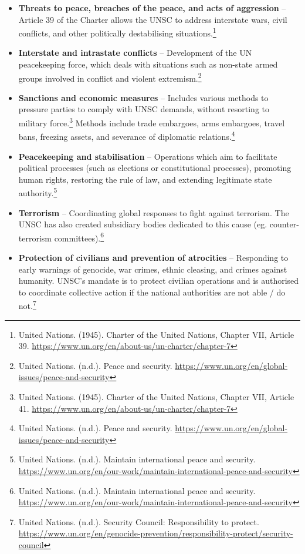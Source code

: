 \begin{itemize}
  \item \textbf{Threats to peace, breaches of the peace, and acts of aggression} -- Article 39 of the Charter allows the UNSC to address interstate wars, civil conflicts, and other politically destabilising situations.\footnote{United Nations. (1945). Charter of the United Nations, Chapter VII, Article 39. \url{https://www.un.org/en/about-us/un-charter/chapter-7}}
  \item \textbf{Interstate and intrastate conflicts} -- Development of the UN peacekeeping force, which deals with situations such as non-state armed groups involved in conflict and violent extremism.\footnote{United Nations. (n.d.). Peace and security. \url{https://www.un.org/en/global-issues/peace-and-security}}
  \item \textbf{Sanctions and economic measures} -- Includes various methods to pressure parties to comply with UNSC demands, without resorting to military force.\footnote{United Nations. (1945). Charter of the United Nations, Chapter VII, Article 41. \url{https://www.un.org/en/about-us/un-charter/chapter-7}} Methods include trade embargoes, arms embargoes, travel bans, freezing assets, and severance of diplomatic relations.\footnote{United Nations. (n.d.). Peace and security. \url{https://www.un.org/en/global-issues/peace-and-security}}
  \item \textbf{Peacekeeping and stabilisation} -- Operations which aim to facilitate political processes (such as elections or constitutional processes), promoting human rights, restoring the rule of law, and extending legitimate state authority.\footnote{United Nations. (n.d.). Maintain international peace and security. \url{https://www.un.org/en/our-work/maintain-international-peace-and-security}}
  \item \textbf{Terrorism} -- Coordinating global responses to fight against terrorism. The UNSC has also created subsidiary bodies dedicated to this cause (eg. counter-terrorism committees).\footnote{United Nations. (n.d.). Maintain international peace and security. \url{https://www.un.org/en/our-work/maintain-international-peace-and-security}}
  \item \textbf{Protection of civilians and prevention of atrocities} -- Responding to early warnings of genocide, war crimes, ethnic cleasing, and crimes against humanity. UNSC’s mandate is to protect civilian operations and is authorised to coordinate collective action if the national authorities are not able / do not.\footnote{United Nations. (n.d.). Security Council: Responsibility to protect. \url{https://www.un.org/en/genocide-prevention/responsibility-protect/security-council}}

\end{itemize}
